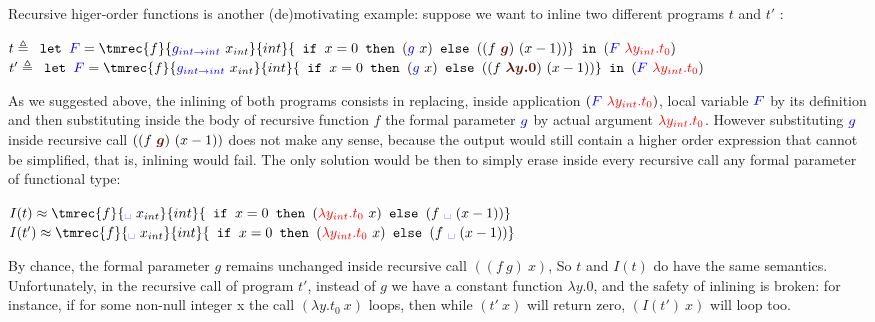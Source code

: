 \documentclass[a4paper,11pt,oneside]{article}
\theoremstyle{plain}
\begin{document}
Recursive higer-order functions is another (de)motivating example:  suppose we want to inline two different programs $t$ and $t'$ : \\
\begin{footnotesize}
$ t \triangleq 
	\texttt{ let } \textcolor{blue}{F} =  
	\tmrec{f}{\textcolor{blue}{g_{int \rightarrow int}}~x_{int}}{int}
	{\texttt{ if } x = 0 \texttt{ then } (\textcolor{blue}{g}~x) \texttt{ else } ((f~\textcolor{Sepia}{\boldsymbol{g}})~(x - 1))}  \texttt{ in } (\textcolor{blue}{F}~\textcolor{red}{\lambda y_{int}. t_0}) $ \\[0.15cm]
$ t' \triangleq 
	\texttt{ let } \textcolor{blue}{F} =  
	\tmrec{f}{\textcolor{blue}{g_{int \rightarrow int}}~x_{int}}{int}
	{\texttt{ if } x = 0 \texttt{ then } (\textcolor{blue}{g}~x) \texttt{ else } ((f~\textcolor{Sepia}{\boldsymbol{\lambda y. 0}})~(x - 1))} 
	\texttt{ in } (\textcolor{blue}{F}~\textcolor{red}{\lambda y_{int}. t_0}) $ \\[0.15cm]
\end{footnotesize}

As we suggested above, the inlining of both programs consists in replacing,  inside application $(\textcolor{blue}{F}~\textcolor{red}{\lambda y_{int}. t_0})$, local variable $\textcolor{blue}{F}$ by its definition and then substituting inside the body of recursive function $f$ the formal parameter $\textcolor{blue}{g}$ by actual argument $\textcolor{red}{\lambda y_{int}. t_0}$. However substituting  $\textcolor{blue}{g}$ inside recursive call 
$((f~\textcolor{Sepia}{\boldsymbol{g}})~(x - 1))$ does not make any sense, because the output would still contain a higher order expression that cannot be simplified, that is, inlining would fail. The only solution would be then to simply erase inside every recursive call any formal parameter of functional type:\\[0.15cm]
\begin{footnotesize}
	$ I(t) \approx 
	\tmrec{f}{\textcolor{blue}{\text{\textvisiblespace}}~x_{int}}{int}
	{\texttt{ if } x = 0 \texttt{ then } (\textcolor{red}{\lambda y_{int}. t_0}~x) 
	\texttt{ else } (f~\textcolor{blue}{\text{\textvisiblespace}}~(x-1))} $ \\[0.15cm]
$ I(t') \approx 
	\tmrec{f}{\textcolor{blue}{\text{\textvisiblespace}}~x_{int}}{int}
	{\texttt{ if } x = 0 \texttt{ then } (\textcolor{red}{\lambda y_{int}. t_0}~x) 
	\texttt{ else } (f~\textcolor{blue}{\text{\textvisiblespace}}~(x-1))} $ \\[0.15cm]
\end{footnotesize}
By chance, the formal parameter $g$ remains unchanged inside recursive call 
$((f~g)~x)$, So $t$ and $I(t)$ do have the same semantics. Unfortunately, in the recursive call of program $t'$,  instead of $g$ we have a constant function $\lambda y. 0$, and the safety of inlining is broken: for instance, if for some non-null integer x the call $(\lambda y. t_0~x)$ loops, then while $(t'~x)$ will return zero, $(I(t')~x)$ will loop too. 
\end{document}
